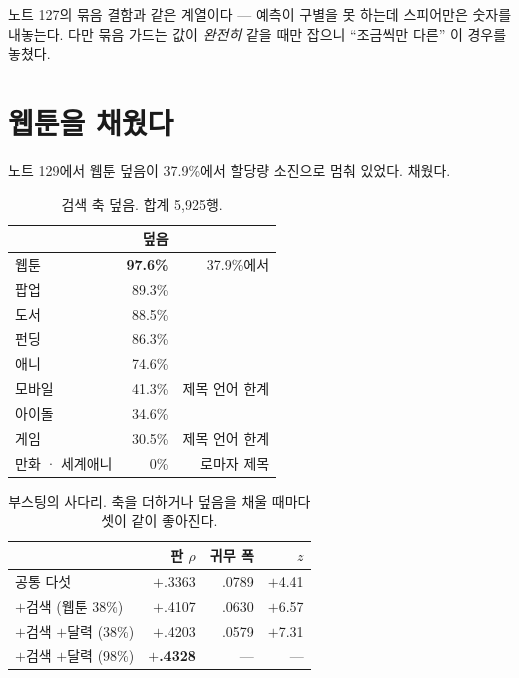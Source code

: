 \documentclass[10pt]{article}
\begin{document}

노트 127의 묶음 결함과 같은 계열이다 --- 예측이 구별을 못 하는데 스피어만은
숫자를 내놓는다. 다만 묶음 가드는 값이 \emph{완전히} 같을 때만 잡으니
``조금씩만 다른'' 이 경우를 놓쳤다.


\section{웹툰을 채웠다}

노트 129에서 웹툰 덮음이 37.9\%에서 할당량 소진으로 멈춰 있었다. 채웠다.

\begin{table}[t]
\centering\tsize
\caption{검색 축 덮음. 합계 5{,}925행.}
\begin{tabular}{lrr}
\toprule
& 덮음 & \\
\midrule
웹툰 & \textbf{97.6\%} & 37.9\%에서 \\
팝업 & 89.3\% & \\
도서 & 88.5\% & \\
펀딩 & 86.3\% & \\
애니 & 74.6\% & \\
모바일 & 41.3\% & 제목 언어 한계 \\
아이돌 & 34.6\% & \\
게임 & 30.5\% & 제목 언어 한계 \\
만화 · 세계애니 & 0\% & 로마자 제목 \\
\bottomrule
\end{tabular}
\end{table}

\begin{table}[t]
\centering\tsize
\caption{부스팅의 사다리. 축을 더하거나 덮음을 채울 때마다 셋이 같이
좋아진다.}
\begin{tabular}{lrrr}
\toprule
& 판 $\rho$ & 귀무 폭 & $z$ \\
\midrule
공통 다섯 & $+$.3363 & .0789 & $+$4.41 \\
$+$검색 (웹툰 38\%) & $+$.4107 & .0630 & $+$6.57 \\
$+$검색 $+$달력 (38\%) & $+$.4203 & .0579 & $+$7.31 \\
$+$검색 $+$달력 (98\%) & \textbf{$+$.4328} & --- & --- \\
\bottomrule
\end{tabular}
\end{table}
\end{document}
